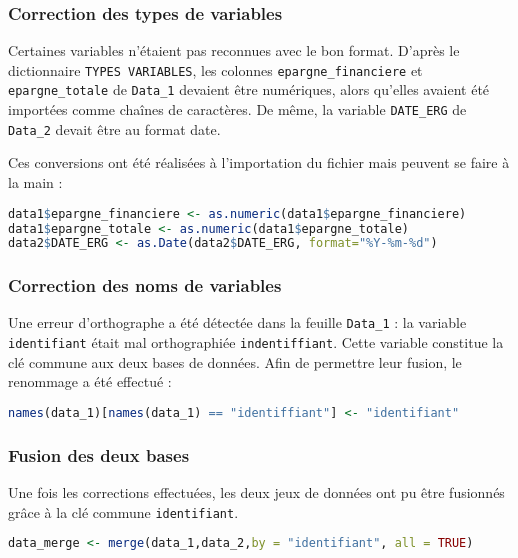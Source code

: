 \subsubsection{Correction des types de variables}
Certaines variables n'étaient pas reconnues avec le bon format.  
D'après le dictionnaire \texttt{TYPES VARIABLES}, les colonnes \texttt{epargne\_financiere} et \texttt{epargne\_totale} de \texttt{Data\_1} devaient être numériques, alors qu'elles avaient été importées comme chaînes de caractères.  
De même, la variable \texttt{DATE\_ERG} de \texttt{Data\_2} devait être au format date.  

Ces conversions ont été réalisées à l'importation du fichier mais peuvent se faire à la main :

\begin{lstlisting}[language=R, caption=Conversion des variables]
data1$epargne_financiere <- as.numeric(data1$epargne_financiere)
data1$epargne_totale <- as.numeric(data1$epargne_totale)
data2$DATE_ERG <- as.Date(data2$DATE_ERG, format="%Y-%m-%d")
\end{lstlisting}

\subsubsection{Correction des noms de variables}
Une erreur d'orthographe a été détectée dans la feuille \texttt{Data\_1} : la variable \texttt{identifiant} était mal orthographiée \texttt{indentiffiant}.  
Cette variable constitue la clé commune aux deux bases de données.  
Afin de permettre leur fusion, le renommage a été effectué :  

\begin{lstlisting}[language=R, caption=Correction de l’orthographe d’une variable]
    names(data_1)[names(data_1) == "identiffiant"] <- "identifiant"
\end{lstlisting}

\subsubsection{Fusion des deux bases}
Une fois les corrections effectuées, les deux jeux de données ont pu être fusionnés grâce à la clé commune \texttt{identifiant}.  

\begin{lstlisting}[language=R, caption=Fusion des bases de données]
    data_merge <- merge(data_1,data_2,by = "identifiant", all = TRUE)
\end{lstlisting}

